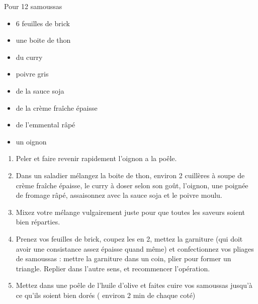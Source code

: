 \bigskip
{}
{Pour 12 samoussas}{\begin{itemize}
	\item 6 feuilles de brick
	\item une boite de thon
	\item du curry
	\item poivre gris
	\item de la sauce soja
	\item de la crème fraîche épaisse
	\item de l'emmental râpé
	\item un oignon
\end{itemize}}
{\begin{enumerate}
	\item Peler et faire revenir rapidement l'oignon a la poêle.
	\item Dans un saladier mélangez la boite de thon, environ 2 cuillères à soupe de crème fraîche épaisse, le curry à doser selon son goût, l'oignon, une poignée de fromage râpé, assaisonnez avec la sauce soja et le poivre moulu.
	\item Mixez votre mélange vulgairement juste pour que toutes les saveurs soient bien réparties.
	\item Prenez vos feuilles de brick, coupez les en 2, mettez la garniture (qui doit avoir une consistance assez épaisse quand même) et confectionnez vos pliages de samoussas : mettre la garniture dans un coin, plier pour former un triangle. Replier dans l'autre sens, et recommencer l'opération.
	\item Mettez dans une poêle de l'huile d'olive et faites cuire vos samoussas jusqu'à ce qu'ils soient bien dorés ( environ 2 min de chaque coté)
\end{enumerate}}

